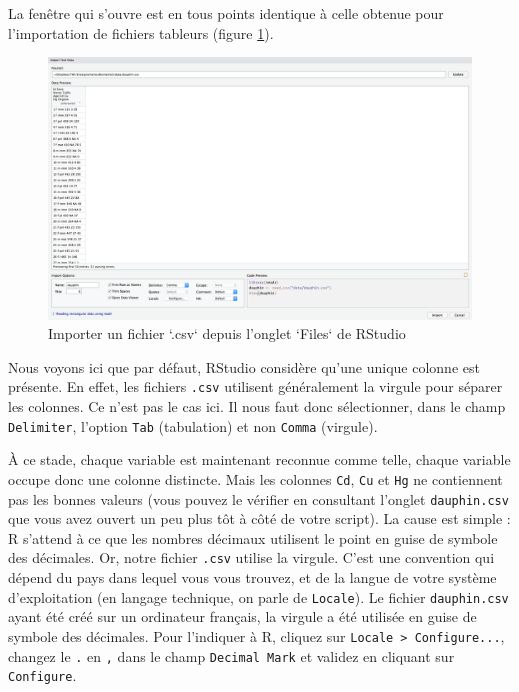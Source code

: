 \documentclass[a4paperpaper,]{article}
\begin{document}
La fenêtre qui s'ouvre est en tous points identique à celle obtenue pour l'importation de fichiers tableurs (figure \ref{fig:importcsv2}).

\begin{figure}[htpb]

{\centering \includegraphics[width=1\linewidth]{images/importcsv2} 

}

\caption{Importer un fichier `.csv` depuis l'onglet `Files` de RStudio}\label{fig:importcsv2}
\end{figure}

Nous voyons ici que par défaut, RStudio considère qu'une unique colonne est présente. En effet, les fichiers \texttt{.csv} utilisent généralement la virgule pour séparer les colonnes. Ce n'est pas le cas ici. Il nous faut donc sélectionner, dans le champ \texttt{Delimiter}, l'option \texttt{Tab} (tabulation) et non \texttt{Comma} (virgule).

À ce stade, chaque variable est maintenant reconnue comme telle, chaque variable occupe donc une colonne distincte. Mais les colonnes \texttt{Cd}, \texttt{Cu} et \texttt{Hg} ne contiennent pas les bonnes valeurs (vous pouvez le vérifier en consultant l'onglet \texttt{dauphin.csv} que vous avez ouvert un peu plus tôt à côté de votre script). La cause est simple : R s'attend à ce que les nombres décimaux utilisent le point en guise de symbole des décimales. Or, notre fichier \texttt{.csv} utilise la virgule. C'est une convention qui dépend du pays dans lequel vous vous trouvez, et de la langue de votre système d'exploitation (en langage technique, on parle de \texttt{Locale}). Le fichier \texttt{dauphin.csv} ayant été créé sur un ordinateur français, la virgule a été utilisée en guise de symbole des décimales. Pour l'indiquer à R, cliquez sur \texttt{Locale\ \textgreater{}\ Configure...}, changez le \texttt{.} en \texttt{,} dans le champ \texttt{Decimal\ Mark} et validez en cliquant sur \texttt{Configure}.
\end{document}
